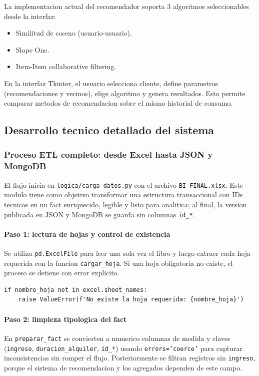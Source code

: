 ﻿\documentclass{article}
\begin{document}
La implementacion actual del recomendador soporta 3 algoritmos seleccionables desde la interfaz:
\begin{itemize}
    \item Similitud de coseno (usuario-usuario).
    \item Slope One.
    \item Item-Item collaborative filtering.
\end{itemize}

En la interfaz Tkinter, el usuario selecciona cliente, define parametros (recomendaciones y vecinos), elige algoritmo y genera resultados. Esto permite comparar metodos de recomendacion sobre el mismo historial de consumo.

\subsection{Desarrollo tecnico detallado del sistema}

\subsubsection{Proceso ETL completo: desde Excel hasta JSON y MongoDB}
El flujo inicia en \texttt{logica/carga\_datos.py} con el archivo \texttt{BI-FINAL.xlsx}. Este modulo tiene como objetivo transformar una estructura transaccional con IDs tecnicos en un fact enriquecido, legible y listo para analitica; al final, la version publicada en JSON y MongoDB se guarda sin columnas \texttt{id\_*}.

\paragraph{Paso 1: lectura de hojas y control de existencia}
Se utiliza \texttt{pd.ExcelFile} para leer una sola vez el libro y luego extraer cada hoja requerida con la funcion \texttt{cargar\_hoja}. Si una hoja obligatoria no existe, el proceso se detiene con error explicito.

\begin{lstlisting}
if nombre_hoja not in excel.sheet_names:
    raise ValueError(f'No existe la hoja requerida: {nombre_hoja}')
\end{lstlisting}

\paragraph{Paso 2: limpieza tipologica del fact}
En \texttt{preparar\_fact} se convierten a numerico columnas de medida y claves (\texttt{ingreso}, \texttt{duracion\_alquiler}, \texttt{id\_*}) usando \texttt{errors='coerce'} para capturar inconsistencias sin romper el flujo.
Posteriormente se filtran registros sin \texttt{ingreso}, porque el sistema de recomendacion y los agregados dependen de este campo.
\end{document}
